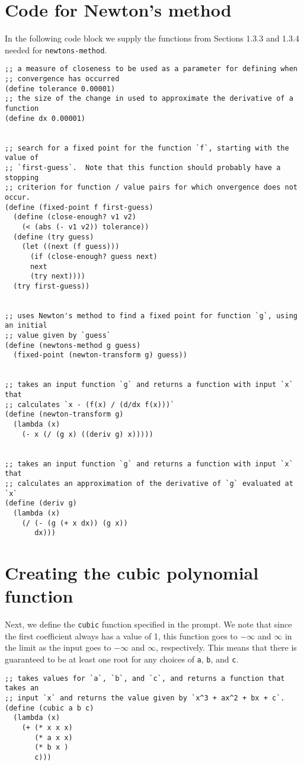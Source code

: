 \documentclass{article}
\begin{document}
\section{Code for Newton's method}

In the following code block we supply the functions from Sections 1.3.3 and
1.3.4 needed for \lstinline{newtons-}\allowbreak{}\lstinline{method}.

\begin{lstlisting}[style=scheme]
;; a measure of closeness to be used as a parameter for defining when
;; convergence has occurred
(define tolerance 0.00001)
;; the size of the change in used to approximate the derivative of a function
(define dx 0.00001)


;; search for a fixed point for the function `f`, starting with the value of
;; `first-guess`.  Note that this function should probably have a stopping
;; criterion for function / value pairs for which onvergence does not occur.
(define (fixed-point f first-guess)
  (define (close-enough? v1 v2)
    (< (abs (- v1 v2)) tolerance))
  (define (try guess)
    (let ((next (f guess)))
      (if (close-enough? guess next)
	  next
	  (try next))))
  (try first-guess))


;; uses Newton's method to find a fixed point for function `g`, using an initial
;; value given by `guess`
(define (newtons-method g guess)
  (fixed-point (newton-transform g) guess))


;; takes an input function `g` and returns a function with input `x` that
;; calculates `x - (f(x) / (d/dx f(x)))`
(define (newton-transform g)
  (lambda (x)
    (- x (/ (g x) ((deriv g) x)))))


;; takes an input function `g` and returns a function with input `x` that
;; calculates an approximation of the derivative of `g` evaluated at `x`
(define (deriv g)
  (lambda (x)
    (/ (- (g (+ x dx)) (g x))
       dx)))
\end{lstlisting}




\section{Creating the cubic polynomial function}

Next, we define the \lstinline{cubic} function specified in the prompt.  We note
that since the first coefficient always has a value of 1, this function goes to
$-\infty$ and $\infty$ in the limit as the input goes to $-\infty$ and $\infty$,
respectively.  This means that there is guaranteed to be at least one root for
any choices of \lstinline{a}, \lstinline{b}, and \lstinline{c}.
\begin{lstlisting}[style=scheme]
;; takes values for `a`, `b`, and `c`, and returns a function that takes an
;; input `x` and returns the value given by `x^3 + ax^2 + bx + c`.
(define (cubic a b c)
  (lambda (x)
    (+ (* x x x)
       (* a x x)
       (* b x )
       c)))
\end{lstlisting}
\end{document}
